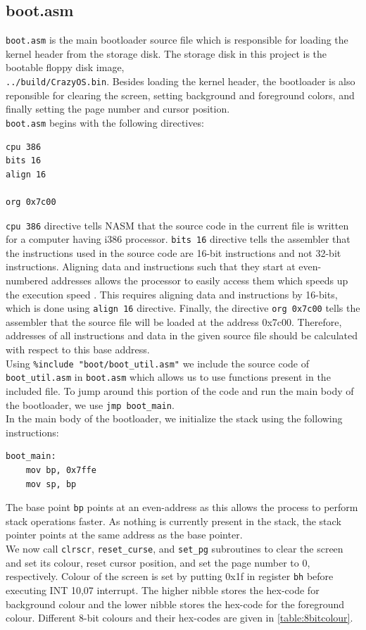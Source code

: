 \subsection{boot.asm}
\texttt{boot.asm} is the main bootloader source file which is responsible for loading the kernel header from the storage disk. The storage disk in this project is the bootable floppy disk image,\\\texttt{../build/CrazyOS.bin}. Besides loading the kernel header, the bootloader is also reponsible for clearing the screen, setting background and foreground colors, and finally setting the page number and cursor position.\\
\texttt{boot.asm} begins with the following directives:
\begin{Verbatim}
cpu 386
bits 16
align 16

org 0x7c00
\end{Verbatim}
\texttt{cpu 386} directive tells NASM that the source code in the current file is written for a computer having i386 processor. \texttt{bits 16} directive tells the assembler that the instructions used in the source code are 16-bit instructions and not 32-bit instructions. Aligning data and instructions such that they start at even-numbered addresses allows the processor to easily access them which speeds up the execution speed \cite{intel1979the}. This requires aligning data and instructions by 16-bits, which is done using \texttt{align 16} directive. Finally, the directive \texttt{org 0x7c00} tells the assembler that the source file will be loaded at the address 0x7c00. Therefore, addresses of all instructions and data in the given source file should be calculated with respect to this base address.\\
Using \texttt{\%include "boot/boot\_util.asm"} we include the source code of \texttt{boot\_util.asm} in \verb|boot.asm| which allows us to use functions present in the included file. To jump around this portion of the code and run the main body of the bootloader, we use \texttt{jmp boot\_main}.\\
In the main body of the bootloader, we initialize the stack using the following instructions:
\begin{Verbatim}
boot_main:
	mov bp, 0x7ffe
	mov sp, bp
\end{Verbatim}
The base point \verb|bp| points at an even-address as this allows the process to perform stack operations faster. As nothing is currently present in the stack, the stack pointer points at the same address as the base pointer.\\
We now call \verb|clrscr|, \verb|reset_curse|, and \verb|set_pg| subroutines to clear the screen and set its colour, reset cursor position, and set the page number to 0, respectively. Colour of the screen is set by putting 0x1f in register \verb|bh| before executing INT 10,07 interrupt. The higher nibble stores the hex-code for background colour and the lower nibble stores the hex-code for the foreground colour. Different 8-bit colours and their hex-codes are given in \autoref{table:8bitcolour}.

